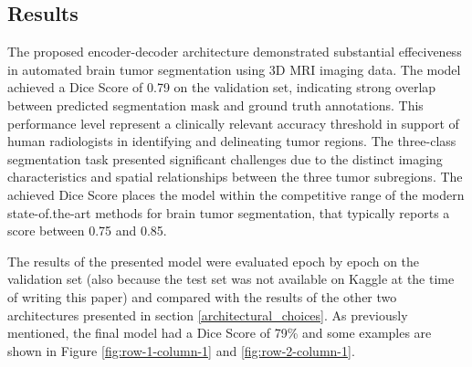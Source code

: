 \documentclass[10pt,twocolumn,letterpaper]{article}
\begin{document}
\subsection{Results}
The proposed encoder-decoder architecture demonstrated substantial effeciveness in automated brain tumor segmentation using 3D MRI imaging data. The model achieved a Dice Score of 0.79 on the validation set, indicating strong overlap between predicted segmentation mask and ground truth annotations. This performance level represent a clinically relevant accuracy threshold in support of human radiologists in identifying and delineating tumor regions.
The three-class segmentation task presented significant challenges due to the distinct imaging characteristics and spatial relationships between the three tumor subregions.
The achieved Dice Score places the model within the competitive range of the modern state-of.the-art methods for brain tumor segmentation, that typically reports a score between 0.75 and 0.85.

The results of the presented model were evaluated epoch by epoch on the validation set (also because the test set was not available on Kaggle at the time of writing this paper) and compared with the results of the other two architectures presented in section \ref{architectural_choices}.
As previously mentioned, the final model had a Dice Score of 79\% and some examples are shown in Figure \ref{fig:row-1-column-1} and \ref{fig:row-2-column-1}.
\end{document}
